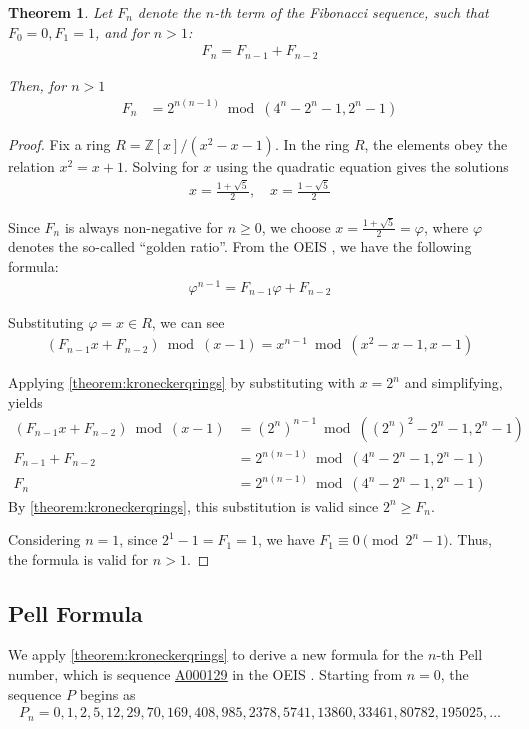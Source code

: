 \documentclass[11pt,reqno]{article}
\theoremstyle{plain}
\newtheorem{theorem}{Theorem}
\theoremstyle{definition}
\newcommand{\seqnum}[1]{\href{https://oeis.org/#1}{\rm \underline{#1}}}
\begin{document}
\begin{theorem} \label{theorem:fibonacci}
Let $F_n$ denote the $n$-th term of the Fibonacci sequence, such that $F_0 = 0, F_1 = 1$, and for $n > 1$:
\begin{align*}
    F_n = F_{n-1} + F_{n-2}
\end{align*}

Then, for $n > 1$
\begin{align*}
F_n &= 2^{n (n - 1)} \bmod{(4^n-2^n-1, 2^n-1)}
\end{align*}
\end{theorem}
\begin{proof}
Fix a ring $R = \mathbb{Z}[x]/(x^2 - x - 1)$. In the ring $R$, the elements obey the relation $x^2 = x + 1$. Solving for $x$ using the quadratic equation gives the solutions
\begin{align*}
    x = \frac{1 + \sqrt{5}}{2}, \quad x = \frac{1 - \sqrt{5}}{2}
\end{align*}

Since $F_n$ is always non-negative for $n \geq 0$, we choose $x = \frac{1 + \sqrt{5}}{2} = \varphi$, where $\varphi$ denotes the so-called ``golden ratio''. From the OEIS \cite{A000045}, we have the following formula:
\begin{align*}
    \varphi^{n-1} = F_{n-1} \varphi + F_{n-2}
\end{align*}

Substituting $\varphi = x \in R$, we can see
\begin{align*}
    (F_{n-1} x + F_{n-2}) \bmod{(x-1)} = x^{n-1} \bmod{(x^2 - x - 1, x-1)}
\end{align*}

Applying \cref{theorem:kroneckerqrings} by substituting with $x = 2^n$ and simplifying, yields
\begin{align*}
    (F_{n-1} x + F_{n-2}) \bmod{(x-1)} &= (2^n)^{n-1} \bmod{((2^n)^2 - 2^n - 1, 2^n-1)} \\
    F_{n-1} + F_{n-2} &= 2^{n (n - 1)} \bmod{(4^n - 2^n - 1, 2^n-1)} \\
    F_n &= 2^{n (n - 1)} \bmod{(4^n - 2^n - 1, 2^n-1)}
\end{align*}
By \cref{theorem:kroneckerqrings}, this substitution is valid since $2^n \geq F_n$.

Considering $n = 1$, since $2^1-1 = F_1 = 1$, we have $F_1 \equiv 0 \pmod{2^n - 1}$. Thus, the formula is valid for $n > 1$.
\end{proof}

\subsection{Pell Formula}
We apply \cref{theorem:kroneckerqrings} to derive a new formula for the $n$-th Pell number, which is sequence \seqnum{A000129} in the OEIS \cite{A000129}. Starting from $n=0$, the sequence $P$ begins as
\begin{align*}
    P_n = 0, 1, 2, 5, 12, 29, 70, 169, 408, 985, 2378, 5741, 13860, 33461, 80782, 195025, \ldots
\end{align*}
\end{document}
